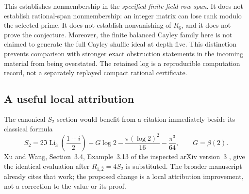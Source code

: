 \documentclass[11pt,a4paper]{article}
\numberwithin{equation}{section}
\theoremstyle{definition}
\theoremstyle{remark}
\DeclareMathOperator{\Li}{Li}
\begin{document}
This establishes nonmembership in the \emph{specified finite-field
row span}.  It does not establish rational-span nonmembership:
an integer matrix can lose rank modulo the selected prime.
It does not establish nonvanishing of $R_6$, and it does not prove
the conjecture.  Moreover, the finite balanced Cayley family here
is not claimed to generate the full Cayley shuffle ideal at depth
five.  This distinction prevents comparison with stronger exact
obstruction statements in the incoming material from being
overstated.  The retained log is a reproducible computation record,
not a separately replayed compact rational certificate.

\subsection{A useful local attribution}

The canonical $S_2$ section would benefit from a citation immediately
beside its classical formula
\begin{equation}
 S_2=2\Im\Li_3\!\left(\frac{1+i}{2}\right)
       -G\log2-\frac{\pi(\log2)^2}{16}-\frac{\pi^3}{64},
 \qquad G=\beta(2).
 \label{eq:S2attribution}
\end{equation}
Xu and Wang, Section~3.4, Example~3.13 of the inspected arXiv
version~3 \cite{XuWang}, give the identical evaluation after
$R_{1,\bar2}=4S_2$ is substituted.  The broader manuscript already
cites that work; the proposed change is a local attribution
improvement, not a correction to the value or its proof.
\end{document}
